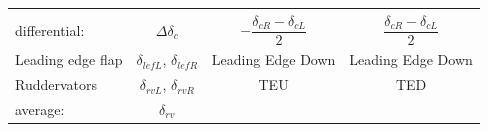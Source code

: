 \documentclass[
]{book}
\begin{document}
\begin{longtable}[]{@{}lccc@{}}
\begin{minipage}[t]{0.29\columnwidth}
\end{minipage} & \begin{minipage}[t]{0.27\columnwidth}\centering
\strut
\end{minipage}\tabularnewline
\begin{minipage}[t]{0.19\columnwidth}\raggedright
differential:\strut
\end{minipage} & \begin{minipage}[t]{0.14\columnwidth}\centering
\(\Delta\delta_c\)\strut
\end{minipage} & \begin{minipage}[t]{0.29\columnwidth}\centering
\[-\frac{\delta_{cR} - \delta_{cL}}{2}\]\strut
\end{minipage} & \begin{minipage}[t]{0.27\columnwidth}\centering
\[\frac{\delta_{cR} - \delta_{cL}}{2}\]\strut
\end{minipage}\tabularnewline
\begin{minipage}[t]{0.19\columnwidth}\raggedright
Leading edge flap\strut
\end{minipage} & \begin{minipage}[t]{0.14\columnwidth}\centering
\(\delta_{lefL}\),
\(\delta_{lefR}\)\strut
\end{minipage} & \begin{minipage}[t]{0.29\columnwidth}\centering
Leading Edge Down\strut
\end{minipage} & \begin{minipage}[t]{0.27\columnwidth}\centering
Leading Edge Down\strut
\end{minipage}\tabularnewline
\begin{minipage}[t]{0.19\columnwidth}\raggedright
Ruddervators\strut
\end{minipage} & \begin{minipage}[t]{0.14\columnwidth}\centering
\(\delta_{rvL}\),
\(\delta_{rvR}\)\strut
\end{minipage} & \begin{minipage}[t]{0.29\columnwidth}\centering
TEU\strut
\end{minipage} & \begin{minipage}[t]{0.27\columnwidth}\centering
TED\strut
\end{minipage}\tabularnewline
\begin{minipage}[t]{0.19\columnwidth}\raggedright
average:\strut
\end{minipage} & \begin{minipage}[t]{0.14\columnwidth}\centering
\(\delta_{rv}\)\strut

\end{minipage}
\end{longtable}
\end{document}
